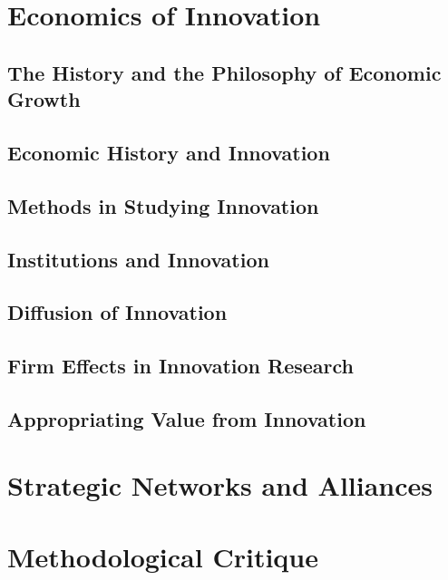 \documentclass[12pt,letterpaper]{article}
\begin{document}
\newpage

\section{Economics of Innovation}
\subsection{The History and the Philosophy of Economic Growth}
\subsection{Economic History and Innovation}
\subsection{Methods in Studying Innovation}
\subsection{Institutions and Innovation}
\subsection{Diffusion of Innovation}
\subsection{Firm Effects in Innovation Research}
\subsection{Appropriating Value from Innovation}


\newpage

\section{Strategic Networks and Alliances}


\newpage

\section{Methodological Critique}
\end{document}
